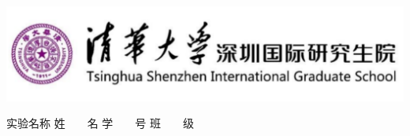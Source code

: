 \begin{titlepage}
    \voffset 2.7cm
    \begin{center}

        \includegraphics[width=15cm]{cover/logo}\\[1cm]

        \vskip 0.7cm
        \vskip 2cm
        \vskip 4cm

        \vskip 2cm
        {
            \songti 实验名称\coverunderline[5.5cm]{}
            \vskip 0.7cm
            \songti 姓~~~~名\coverunderline[5.5cm]{}
            \vskip 0.7cm
            \songti 学~~~~号\coverunderline[5.5cm]{}
            \vskip 0.7cm
            \songti 班~~~~级\coverunderline[5.5cm]{}
            \vfill
        }
    \end{center}
\end{titlepage}
\songti \normalsize

\endinput
